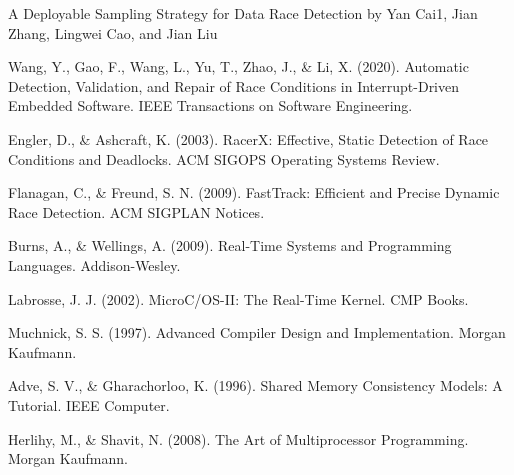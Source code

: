 \documentclass[
fancyheadings, %
%
%
]{stsreprt}
\begin{document}
	
	A Deployable Sampling Strategy for Data Race Detection by Yan Cai1, Jian Zhang, Lingwei Cao, and Jian Liu
	\begin{thebibliography}{9}
		Wang, Y., Gao, F., Wang, L., Yu, T., Zhao, J., \& Li, X. (2020). Automatic Detection, Validation, and Repair of Race Conditions in Interrupt-Driven Embedded Software. IEEE Transactions on Software Engineering.
		
		Engler, D., \& Ashcraft, K. (2003). RacerX: Effective, Static Detection of Race Conditions and Deadlocks. ACM SIGOPS Operating Systems Review.
		
		Flanagan, C., \& Freund, S. N. (2009). FastTrack: Efficient and Precise Dynamic Race Detection. ACM SIGPLAN Notices.
		
		Burns, A., \& Wellings, A. (2009). Real-Time Systems and Programming Languages. Addison-Wesley.
		
		Labrosse, J. J. (2002). MicroC/OS-II: The Real-Time Kernel. CMP Books.
		
		Muchnick, S. S. (1997). Advanced Compiler Design and Implementation. Morgan Kaufmann.
		
		Adve, S. V., \& Gharachorloo, K. (1996). Shared Memory Consistency Models: A Tutorial. IEEE Computer.
		
		Herlihy, M., \& Shavit, N. (2008). The Art of Multiprocessor Programming. Morgan Kaufmann.
	\end{thebibliography}
	
\end{document}
